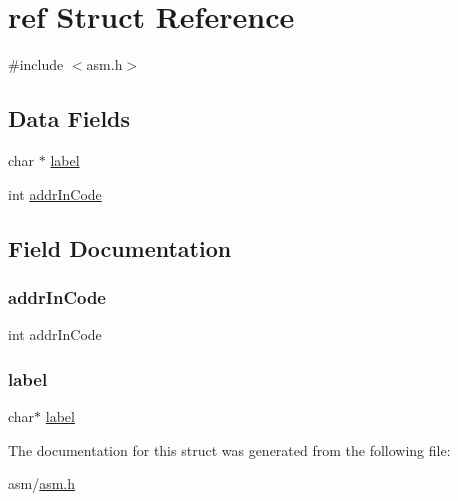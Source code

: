 \hypertarget{structref}{}\section{ref Struct Reference}
\label{structref}


{\ttfamily \#include $<$asm.\+h$>$}

\subsection*{Data Fields}
\begin{DoxyCompactItemize}
\item 
char $\ast$ \hyperlink{structref_acf60de4c64d60c1b9449c056bc6bfcf7}{label}
\item 
int \hyperlink{structref_acc8fb096da23df318c3645246eba7129}{addr\+In\+Code}
\end{DoxyCompactItemize}


\subsection{Field Documentation}
\mbox{\label{structref_acc8fb096da23df318c3645246eba7129}} 
\subsubsection{\texorpdfstring{addr\+In\+Code}{addrInCode}}
{\footnotesize\ttfamily int addr\+In\+Code}

\mbox{\label{structref_acf60de4c64d60c1b9449c056bc6bfcf7}} 
\subsubsection{\texorpdfstring{label}{label}}
{\footnotesize\ttfamily char$\ast$ \hyperlink{structlabel}{label}}



The documentation for this struct was generated from the following file\+:\begin{DoxyCompactItemize}
\item 
asm/\hyperlink{asm_8h}{asm.\+h}\end{DoxyCompactItemize}
